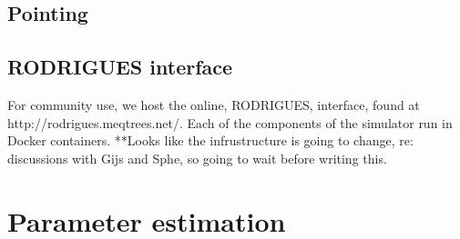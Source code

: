 \subsection{Pointing}

\subsection{RODRIGUES interface}
For community use, we host the online, RODRIGUES, interface, found at http://rodrigues.meqtrees.net/. Each of the components of the simulator run in Docker containers. **Looks like the infrustructure is going to change, re: discussions with Gijs and Sphe, so going to wait before writing this.

\section{Parameter estimation}
